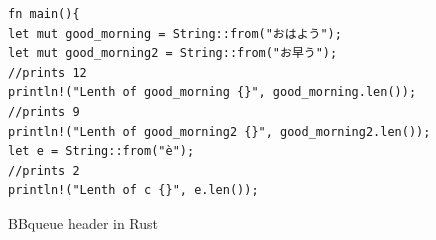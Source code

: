 \documentclass[nomenclature, english, bibtex]{kththesis}
\newcommand*{\generalExpl}[1]{\todo[inline]{#1}}
\newcommand*{\warningExpl}[1]{\todo[inline, backgroundcolor=kth-lightred40]{#1}} %
\begin{document}
\begin{listing}[!ht]
\begin{verbatim} 
fn main(){
let mut good_morning = String::from("おはよう");
let mut good_morning2 = String::from("お早う");
//prints 12    
println!("Lenth of good_morning {}", good_morning.len());
//prints 9  
println!("Lenth of good_morning2 {}", good_morning2.len());
let e = String::from("è");
//prints 2  
println!("Lenth of c {}", e.len());
\end{verbatim}
\caption[BBqueue header in Rust]{BBqueue header in Rust}
\label{lst:grapheme}
\end{listing}

\end{document}

